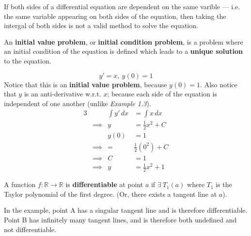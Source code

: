 \documentclass[twoside]{report}
\begin{document}
    \begin{remark}
        If both sides of a differential equation are dependent on the same varible --- i.e. the same variable appearing on both sides of the equation, then taking the intergal of both sides is not a valid method to solve the equation.
    \end{remark}
    \begin{definition}
        An \textbf{initial value problem}, or \textbf{initial condition problem}, is a problem where an initial condition of the equation is defined which leads to a \textbf{unique solution} to the equation.
    \end{definition}
    \np
    \begin{example}
        \begin{equation}
            y' = x,\ y(0) = 1
        \end{equation}
        Notice that this is an \textbf{initial value problem}, because $y(0) = 1$. Also notice that $y$ is an anti-derivative w.r.t. $x$; because each side of the equation is independent of one another (unlike \emph{Example 1.3}).
        \begin{alignat}{3}
            &&\int y'\,dx &= \int x\,dx\\
            &\implies & y &= \frac{1}{2}x^{2} + C\\
            &&y(0) &= 1\\
            &\implies&=&\frac{1}{2}(0^2) + C\\
            &\implies&C&=1\\
            &\implies&y&=\frac{1}{2}x^{2} + 1
        \end{alignat}
    \end{example}
    \begin{definition}
        A function $f: \mathbb{R} \to \mathbb{R}$ is \textbf{differentiable} at point $a$ if $\exists\ T_1(a)$ where $T_1$ is the Taylor polynomial of the first degree. (Or, there exists a tangent line at $a$).
        \begin{center}
        \end{center}
        In the example, point A has a singular tangent line and is therefore differentiable. Point B has infinitely many tangent lines, and is therefore both undefined and not differentiable.
    \end{definition}
\end{document}
